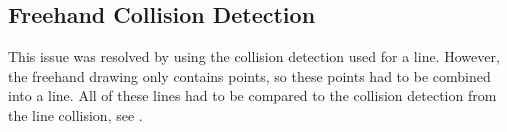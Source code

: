 \subsection{Freehand Collision Detection}
This issue was resolved by using the collision detection used for a line.
However, the freehand drawing only contains points, so these points had to be combined into a line.
All of these lines had to be compared to the collision detection from the line collision, see .